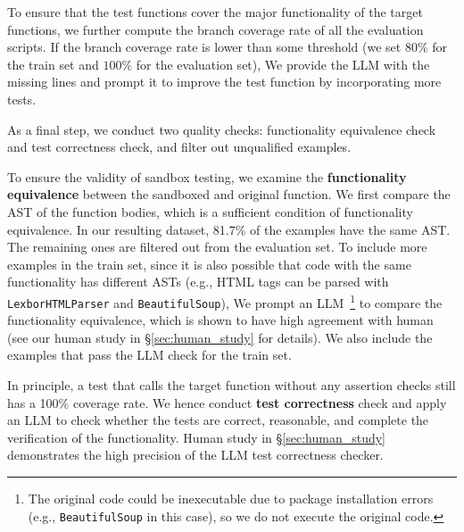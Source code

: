 To ensure that the test functions cover the major functionality of the target functions, we further compute the branch coverage rate of all the evaluation scripts.
If the branch coverage rate is lower than some threshold (we set $80\%$ for the train set and $100\%$ for the evaluation set),
We provide the LLM with the missing lines and prompt it to improve the test function by incorporating more tests.


As a final step, we conduct two quality checks: functionality equivalence check and test correctness check, and filter out unqualified examples. 


To ensure the validity of sandbox testing, we examine the \textbf{functionality equivalence} between the sandboxed and original function.
We first compare the AST of the function bodies, which is a sufficient condition of functionality equivalence. 
In our resulting dataset, 81.7\% of the examples have the same AST. The remaining ones are filtered out from the evaluation set. 
To include more examples in the train set, 
since it is also possible that code with the same functionality has different ASTs (e.g., HTML tags can be parsed with \texttt{LexborHTMLParser} and \texttt{BeautifulSoup}),
We prompt an LLM~\footnote{The original code could be inexecutable due to package installation errors (e.g., \texttt{BeautifulSoup} in this case), so we do not execute the original code.} to compare the functionality equivalence, which is shown to have high agreement with human (see our human study in \S\ref{sec:human_study} for details).
We also include the examples that pass the LLM check for the train set.


In principle, a test that calls the target function without any assertion checks still has a 100\% coverage rate.
We hence conduct \textbf{test correctness} check and apply an LLM to check whether the tests are correct, reasonable, and complete the verification of the functionality. Human study in \S\ref{sec:human_study} demonstrates the high precision of the LLM test correctness checker.


